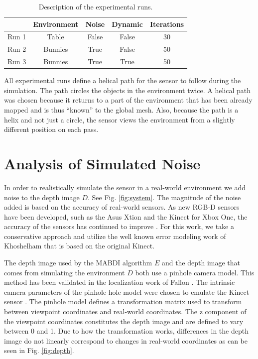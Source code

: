 \begin{table}[h]
  \caption{Description of the experimental runs.}
  \label{tab:run}
  \begin{footnotesize}
  \begin{center}
    \begin{tabular}{|l|c|c|c|c|}
    \hline
           & Environment & Noise   & Dynamic & Iterations \\\hline
    Run 1	 & Table       & False   & False   & 30 \\
    Run 2  & Bunnies     & True    & False   & 50 \\
    Run 3  & Bunnies     & True    & True    & 50 \\
    \hline
    \end{tabular}
  \end{center}
  \end{footnotesize}
\end{table}

All experimental runs define a helical path for the sensor to follow during the
simulation. The path circles the objects in the environment twice. A helical
path was chosen because it returns to a part of the environment that has been
already mapped and is thus ``known'' to the global mesh. Also, because the path
is a helix and not just a circle, the sensor views the environment from a
slightly different position on each pass.

\section{Analysis of Simulated Noise} \label{chapter:experimentalsetup:analysisofsimulatednoise}

In order to realistically simulate the sensor in a real-world environment we add
noise to the depth image $D$. See Fig. \ref{fig:system}. The magnitude of the
noise added is based on the accuracy of real-world sensors. As new RGB-D sensors
have been developed, such as the Asus Xtion and the Kinect for Xbox One, the
accuracy of the sensors has continued to improve \cite{lachat2015first}. For
this work, we take a conservative approach and utilize the well known error
modeling work of Khoshelham \cite{Khoshelham2012} that is based on the original
Kinect.

The depth image used by the MABDI algorithm $E$ and the depth image that comes
from simulating the environment $D$ both use a pinhole camera model. This method
has been validated in the localization work of Fallon \cite{Fallon2012}. The
intrinsic camera parameters of the pinhole hole model were chosen to emulate the
Kinect sensor \cite{sitekinectspecs}. The pinhole model defines a transformation
matrix used to transform between viewpoint coordinates and real-world
coordinates. The z component of the viewpoint coordinates constitutes the depth
image and are defined to vary between 0 and 1. Due to how the transformation
works, differences in the depth image do not linearly correspond to changes in
real-world coordinates as can be seen in Fig. \ref{fig:depth}.

